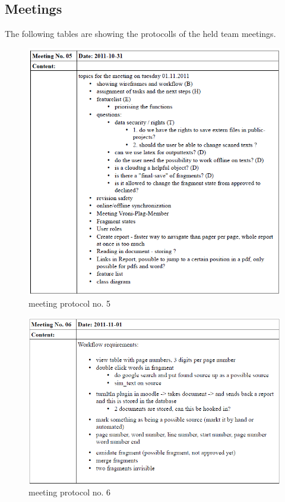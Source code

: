 \begin{appendix}

\chapter{Meetings}
The following tables are showing the protocolls of the held team meetings.


\begin{figure}[htbp]
  \centering
    \includegraphics[width=\textwidth]{images/a_meetings/meeting_05.png}
  \caption{meeting protocol no. 5}
  \label{fig:meeting protocol no. 5}
\end{figure}

\begin{figure}[htbp]
  \centering
    \includegraphics[width=\textwidth]{images/a_meetings/meeting_06.png}
  \caption{meeting protocol no. 6}
  \label{fig:meeting protocol no. 6}
\end{figure}


\end{appendix}

